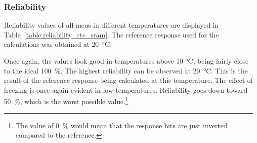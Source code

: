 \subsubsection*{Reliability}

Reliability values of all \glspl{mcu} in different temperatures are displayed in Table~\ref{table:reliability_rtc_sram}. The reference response used for the calculations was obtained at 20~°C.

Once again, the values look good in temperatures above 10 °C, being fairly close to the ideal 100~\%. The highest reliability can be observed at 20~°C. This is the result of the reference response being calculated at this temperature. The effect of freezing is once again evident in low temperatures. Reliability goes down toward 50~\%, which is the worst possible value.\footnote{The value of 0~\% would mean that the response bits are just inverted compared to the reference.} 

